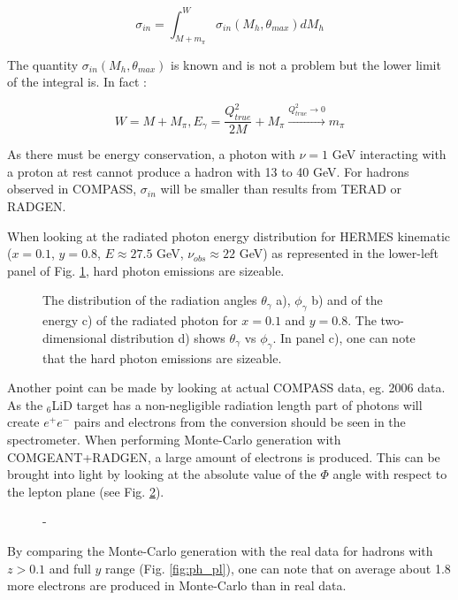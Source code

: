 \begin{equation}
    \sigma_{in} = \int_{M+m_{\pi}}^{W}\sigma_{in}(M_{h},\theta_{max})dM_h
\end{equation}

The quantity $\sigma_{in}(M_{h},\theta_{max})$ is known and is not a problem but the lower limit of the integral is. In fact :

\begin{equation}
    W = M + M_{\pi}, E_{\gamma} = \frac{Q^2_{true}}{2M}+M_{\pi} \xrightarrow{Q^2_{true} \rightarrow 0} m_{\pi}
\end{equation}

As there must be energy conservation, a photon with $\nu = 1$ GeV interacting with a proton at rest cannot produce a hadron with
13 to 40 GeV. For hadrons observed in COMPASS, $\sigma_{in}$ will be smaller than results from TERAD or RADGEN.

When looking at the radiated photon energy distribution for HERMES kinematic ($x=0.1$, $y=0.8$, $E\approx27.5$ GeV, $\nu_{obs}\approx22$ GeV)
as represented in the lower-left panel of Fig. \ref{fig:RAD}, hard photon emissions are sizeable.

\begin{figure}[htb]
\centerline{}
\caption{The distribution of the radiation angles $\theta_{\gamma}$ a), $\phi_{\gamma}$ b) and of the energy c) of the radiated
photon for $x=0.1$ and $y=0.8$. The two-dimensional distribution d) shows $\theta_{\gamma}$ vs $\phi_{\gamma}$. In panel c), one
can note that the hard photon emissions are sizeable.}\label{fig:RAD}
\end{figure}

Another point can be made by looking at actual COMPASS data, eg. 2006 data. As the $_{6}$LiD target has a non-negligible radiation length
part of photons will create $e^+e^-$ pairs and electrons from the conversion should be seen in the spectrometer. When performing Monte-Carlo generation
with COMGEANT+RADGEN, a large amount of electrons is produced. This can be brought into light by looking at the absolute value of the $\Phi$ angle
with respect to the lepton plane (see Fig. \ref{fig:elprod}).

\begin{figure}[htb!]
\centerline{}
\caption{-}\label{fig:elprod}
\end{figure}

By comparing the Monte-Carlo generation with the real data for hadrons with $z>0.1$ and full $y$ range (Fig. \ref{fig:ph_pl}), one can note that on
average about 1.8 more electrons are produced in Monte-Carlo than in real data.

